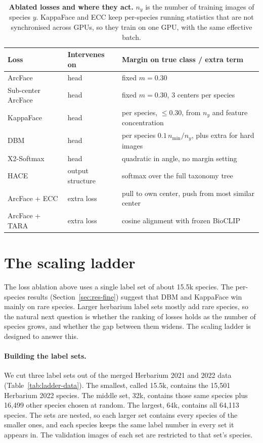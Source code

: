 \documentclass[11pt]{article}
\begin{document}
\begin{table}[t]
\centering
\small
\caption{\textbf{Ablated losses and where they act.} $n_y$ is the number of training
images of species $y$. KappaFace and ECC keep per-species running statistics that are
not synchronised across GPUs, so they train on one GPU, with the same effective
batch.}
\label{tab:losses}
\footnotesize
\begin{tabular}{@{}lll@{}}
\toprule
Loss & Intervenes on & Margin on true class / extra term \\
\midrule
ArcFace & head & fixed $m=0.30$ \\
Sub-center ArcFace & head & fixed $m=0.30$, 3 centers per species \\
KappaFace & head & per species, $\le 0.30$, from $n_y$ and feature concentration \\
DBM & head & per species $0.1\,n_{\min}/n_y$, plus extra for hard images \\
X2-Softmax & head & quadratic in angle, no margin setting \\
HACE & output structure & softmax over the full taxonomy tree \\
ArcFace + ECC & extra loss & pull to own center, push from most similar center \\
ArcFace + TARA & extra loss & cosine alignment with frozen BioCLIP \\
\bottomrule
\end{tabular}
\end{table}

\section{The scaling ladder}
\label{sec:ladder}

The loss ablation above uses a single label set of about 15.5k species. The per-species
results (Section~\ref{sec:res-fine}) suggest that DBM and KappaFace win mainly on rare
species. Larger herbarium label sets mostly add rare species, so the natural next
question is whether the ranking of losses holds as the number of species grows, and
whether the gap between them widens. The scaling ladder is designed to answer this.

\paragraph{Building the label sets.} We cut three label sets out of the merged Herbarium
2021 and 2022 data (Table~\ref{tab:ladder-data}). The smallest, called 15.5k, contains
the 15{,}501 Herbarium 2022 species. The middle set, 32k, contains those same species
plus 16{,}499 other species chosen at random. The largest, 64k, contains all 64{,}113
species. The sets are nested, so each larger set contains every species of the smaller
ones, and each species keeps the same label number in every set it appears in. The
validation images of each set are restricted to that set's species.
\end{document}
